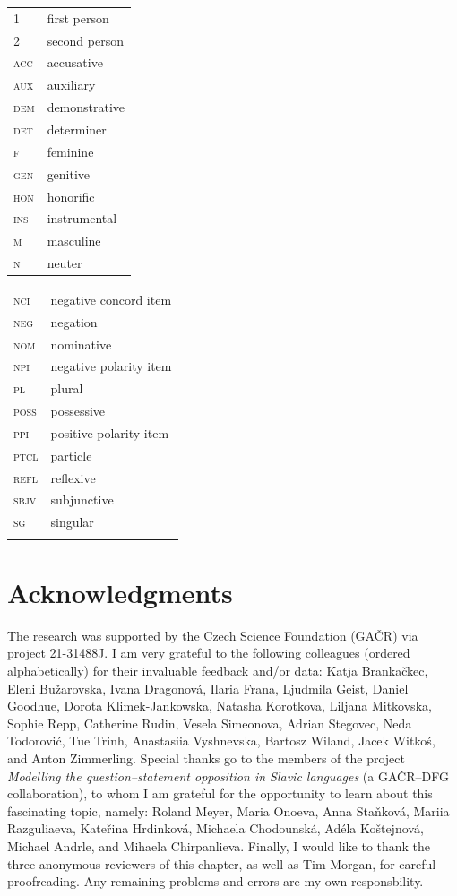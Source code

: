 \documentclass[output=paper,colorlinks,citecolor=brown]{langscibook}
\begin{document}
\begin{tabularx}{.5\textwidth}{@{}lQ}
\textsc{1}&first person\\
\textsc{2}&second person\\
\textsc{acc}&accusative\\
\textsc{aux}&auxiliary\\
\textsc{dem}&demonstrative\\
\textsc{det}&determiner\\
\textsc{f}&feminine\\
\textsc{gen}&genitive\\
\textsc{hon}&honorific\\
\textsc{ins}&instrumental\\
\textsc{m}&masculine\\
\textsc{n}&neuter\\
\end{tabularx}%
\begin{tabularx}{.5\textwidth}{lQ@{}}
\textsc{nci}&negative concord item\\
\textsc{neg}&negation\\
\textsc{nom}&nominative\\
\textsc{npi}&negative polarity item\\
\textsc{pl}&plural\\
\textsc{poss}&possessive\\
\textsc{ppi}&positive polarity item\\
\textsc{ptcl}&particle\\
\textsc{refl}&reflexive\\
\textsc{sbjv}&subjunctive\\
\textsc{sg}&singular\\
&\\ %
\end{tabularx}

\section*{Acknowledgments}
The research was supported by the Czech Science Foundation (GAČR) via project 21-31488J. I am very grateful to the following colleagues (ordered alphabetically) for their invaluable feedback and/or data: Katja Brankačkec, Eleni Bužarovska, Ivana Dragonová, Ilaria Frana, Ljudmila Geist, Daniel Goodhue, Dorota Klimek-Jankowska, Natasha Korotkova, Liljana Mitkovska, Sophie Repp, Catherine Rudin, Vesela Simeonova, Adrian Stegovec, Neda Todorović, Tue Trinh, Anastasiia Vyshnevska, Bartosz Wiland, Jacek Witkoś, and Anton Zimmerling. Special thanks go to the members of the project \textit{Modelling the question--statement opposition in Slavic languages} (a GAČR--DFG collaboration), to whom I am grateful for the opportunity to learn about this fascinating topic, namely: Roland Meyer, Maria Onoeva, Anna Staňková, Mariia Razguliaeva, Kateřina Hrdin\-ková, Michaela Chodounská, Adéla Koštejnová, Michael Andrle, and Mihaela Chirpanlieva. Finally, I would like to thank the three anonymous reviewers of this chapter, as well as Tim Morgan, for careful proofreading. Any remaining problems and errors are my own responsbility.

\printbibliography[heading=subbibliography,notkeyword=this]
\end{document}
